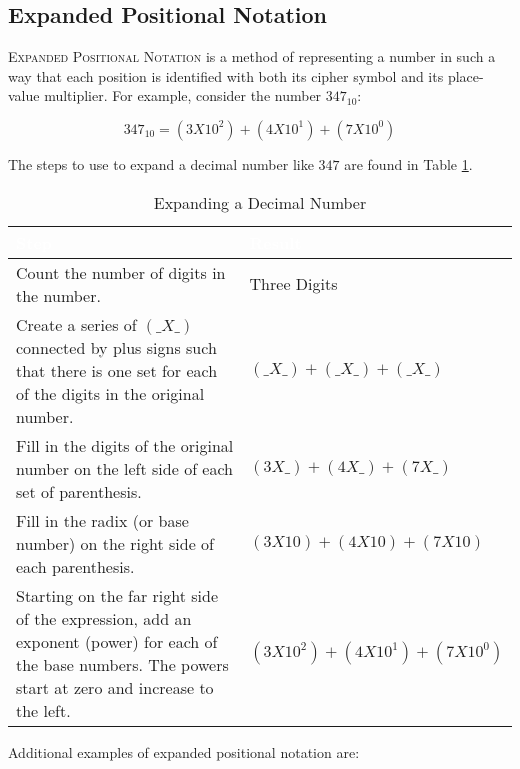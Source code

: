 \subsection{Expanded Positional Notation}
\label{MF:sub:expanded_positional_notation}
\textsc{Expanded Positional Notation} is a method of representing a number in such a way that each position is identified with both its cipher symbol and its place-value multiplier. For example, consider the number $ 347_{10} $:

\begin{equation}
347_{10}=(3X10^2)+(4X10^1)+(7X10^0)
\end{equation}

The steps to use to expand a decimal number like $ 347 $ are found in Table \ref{MF:tab:expand_347}.

\begin{table}[H]
  \sffamily
  \newcommand{\head}[1]{\textcolor{white}{\textbf{#1}}}      
  \begin{center}
    \begin{tabular}{ p{7cm} l } 
      \hline
      \rowcolor{black!75}
      \head{Step} & \head{Result} \\ 
      \hline 
      Count the number of digits in the number. & Three Digits  \\ 
      Create a series of $ (\_ X\_) $ connected by plus signs such that there is one set for each of the digits in the original number. & $ ( \_X\_ ) + ( \_X\_ ) + ( \_X\_ ) $  \\ \hline
      Fill in the digits of the original number on the left side of each set of parenthesis. & $ ( 3X\_ ) + ( 4X\_ ) + ( 7X\_ ) $  \\ 
      Fill in the radix (or base number) on the right side of each parenthesis. & $ ( 3X10 ) + ( 4X10 ) + ( 7X10 ) $  \\ 
      Starting on the far right side of the expression, add an exponent (power) for each of the base numbers. The powers start at zero and increase to the left. & $ ( 3X10^2 ) + ( 4X10^1 ) + ( 7X10^0 ) $ \\
      \hline
    \end{tabular} 
  \end{center}
  \caption{Expanding a Decimal Number}
  \label{MF:tab:expand_347}
\end{table}

Additional examples of expanded positional notation are: 

